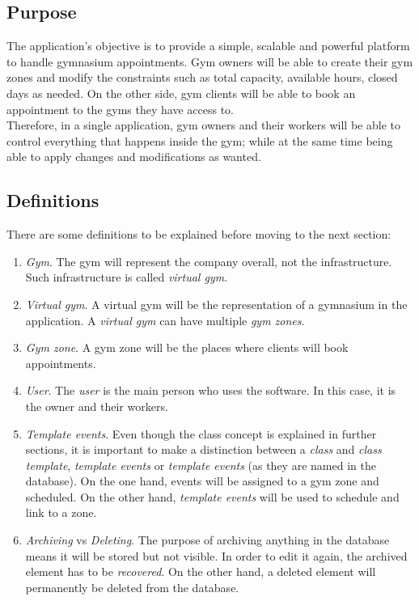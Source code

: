 \documentclass[a4paper, 12pt, oneside]{book}
\begin{document}
\subsection{Purpose}
The application's objective is to provide a simple, scalable and powerful platform to handle gymnasium appointments. Gym owners will be able to create their gym zones and modify the constraints such as total capacity, available hours, closed days as needed. On the other side, gym clients will be able to book an appointment to the gyms they have access to.
\\[8pt]
Therefore, in a single application, gym owners and their workers will be able to control everything that happens inside the gym; while at the same time being able to apply changes and modifications as wanted.
\subsection{Definitions}
There are some definitions to be explained before moving to the next section:
\begin{enumerate}[label = -]
	\item \emph{Gym}. The gym will represent the company overall, not the infrastructure. Such infrastructure is called \emph{virtual gym}.
	\item \emph{Virtual gym}. A virtual gym will be the representation of a gymnasium in the application. A \emph{virtual gym} can have multiple \emph{gym zones}.
	\item \emph{Gym zone}. A gym zone will be the places where clients will book appointments.
	\item \emph{User}. The \emph{user} is the main person who uses the software. In this case, it is the owner and their workers.
	\item \emph{Template events}. Even though the class concept is explained in further sections, it is important to make a distinction between a \emph{class} and \emph{class template}, \emph{template events} or \emph{template events} (as they are named in the database). On the one hand, events will be assigned to a gym zone and scheduled. On the other hand, \emph{template events} will be used to schedule and link to a zone.
	\item \emph{Archiving} vs \emph{Deleting}. The purpose of archiving anything in the database means it will be stored but not visible. In order to edit it again, the archived element has to be \emph{recovered}. On the other hand, a deleted element will permanently be deleted from the database.
\end{enumerate}
\end{document}
